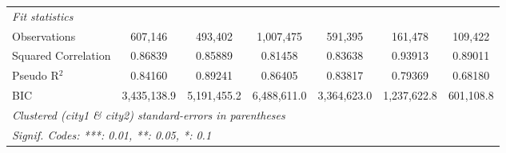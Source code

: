 \begin{tabular}{lcccccc}
   \emph{Fit statistics}\\
   Observations        & 607,146         & 493,402         & 1,007,475       & 591,395         & 161,478         & 109,422\\  
   Squared Correlation & 0.86839         & 0.85889         & 0.81458         & 0.83638         & 0.93913         & 0.89011\\  
   Pseudo R$^2$        & 0.84160         & 0.89241         & 0.86405         & 0.83817         & 0.79369         & 0.68180\\  
   BIC                 & 3,435,138.9     & 5,191,455.2     & 6,488,611.0     & 3,364,623.0     & 1,237,622.8     & 601,108.8\\  
   \midrule \midrule
   \multicolumn{7}{l}{\emph{Clustered (city1 \& city2) standard-errors in parentheses}}\\
   \multicolumn{7}{l}{\emph{Signif. Codes: ***: 0.01, **: 0.05, *: 0.1}}\\
\end{tabular}
\par\endgroup



